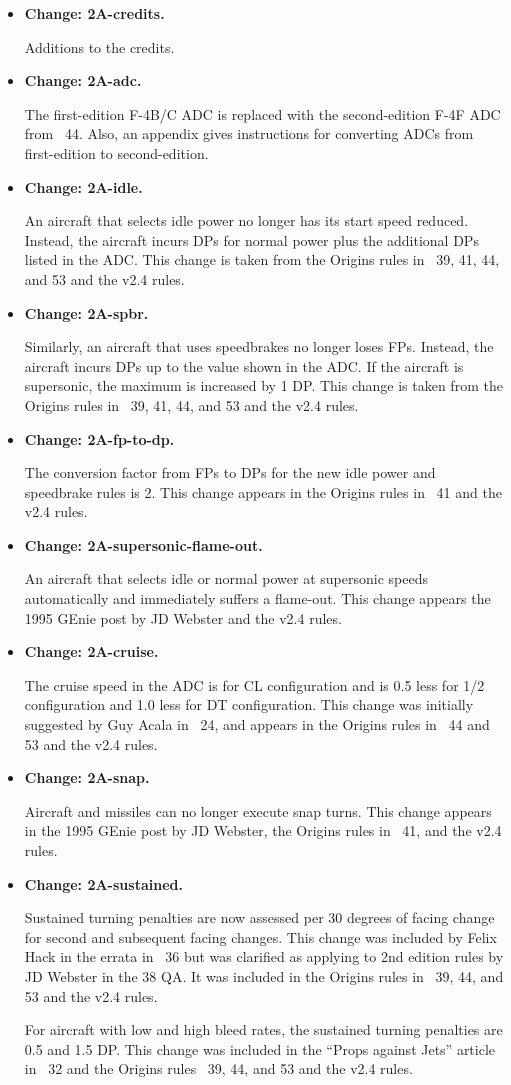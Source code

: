 \documentclass[10pt]{report}
\newcommand{\itemtag}[1]{\item \textbf{Change: #1.}\par}
\begin{document}
\begin{itemize}

    \itemtag{2A-credits} Additions to the credits.

    \itemtag{2A-adc} The first-edition F-4B/C ADC is replaced with the second-edition F-4F ADC from {\APJ}~44. Also, an appendix gives instructions for converting ADCs from first-edition to second-edition.

    \itemtag{2A-idle} An aircraft that selects idle power no longer has its start speed reduced. Instead, the aircraft incurs DPs for normal power plus the additional DPs listed in the ADC. This change is taken from the Origins rules in {\APJ}~39, 41, 44, and 53 and the v2.4 rules. 

    \itemtag{2A-spbr} Similarly, an aircraft that uses speedbrakes no longer loses FPs. Instead, the aircraft incurs DPs up to the value shown in the ADC. If the aircraft is supersonic, the maximum is increased by 1 DP. This change is taken from the Origins rules in {\APJ}~39, 41, 44, and 53 and the v2.4 rules.

    \itemtag{2A-fp-to-dp} The conversion factor from FPs to DPs for the new idle power and speedbrake rules is 2. This change appears in the Origins rules in {\APJ}~41 and the v2.4 rules.

    \itemtag{2A-supersonic-flame-out} An aircraft that selects idle or normal power at supersonic speeds automatically and immediately suffers a flame-out. This change appears the 1995 GEnie post by JD Webster and the v2.4 rules.

    \itemtag{2A-cruise} The cruise speed in the ADC is for CL configuration and is 0.5 less for 1/2 configuration and 1.0 less for DT configuration. This change was initially suggested by Guy Acala in {\APJ}~24, and appears in the Origins rules in {\APJ}~44 and 53 and the v2.4 rules.

    \itemtag{2A-snap} Aircraft and missiles can no longer execute snap turns. This change appears in the 1995 GEnie post by JD Webster, the Origins rules in {\APJ}~41, and the v2.4 rules.

    \itemtag{2A-sustained} Sustained turning penalties are now assessed per 30 degrees of facing change for second and subsequent facing changes. This change was included by Felix Hack in the errata in {\APJ}~36 but was clarified as applying to 2nd edition rules by JD Webster in the {\APJ} 38 QA. It was included in the Origins rules in {\APJ}~39, 44, and 53 and the v2.4 rules.

    For aircraft with low and high bleed rates, the sustained turning penalties are 0.5 and 1.5 DP. This change was included in the “Props against Jets” article in {\APJ}~32 and the Origins rules {\APJ}~39, 44, and 53 and the v2.4 rules.


\end{itemize}
\end{document}
